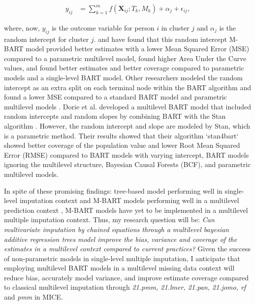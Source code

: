 \documentclass[10pt, a4paper, titlepage]{article}
\begin{document}
\begin{subequations}
\label{eq:M-BART}
\begin{align}
y_{ij} &= \sum_{k=1}^{m} f(\textbf{X}_{ij}; T_{k}, M_{k}) + \alpha_{j} + \epsilon_{ij}, \tag{3}
\end{align}
\end{subequations}

where, now, $y_{ij}$ is the outcome variable for person $i$ in cluster $j$ and $\alpha_{j}$ is the random intercept for cluster $j$. \citet{wagner2020} and have found that this random intercept M-BART model provided better estimates with a lower Mean Squared Error (MSE) compared to a parametric multilevel model, \citet{tan2016} found higher Area Under the Curve values, and \citet{chen2020} found better estimates and better coverage compared to parametric models and a single-level BART model. Other researchers modeled the random intercept as an extra split on each terminal node within the BART algorithm and found a lower MSE compared to a standard BART model and parametric multilevel models \citep{wundervald2022}. Dorie et al. developed a multilevel BART model that included random intercepts and random slopes by combining BART with the Stan algorithm \citep{dorie2022}. However, the random intercept and slope are modeled by Stan, which is a parametric method. Their results showed that their algorithm `stan4bart` showed better coverage of the population value and lower Root Mean Squared Error (RMSE) compared to BART models with varying intercept, BART models ignoring the multilevel structure, Bayesian Causal Forests (BCF), and parametric multilevel models.

In spite of these promising findings: tree-based model performing well in single-level imputation context \citep{burgette2010, xu2016, silva2022, stekhoven2012, waljee2013} and M-BART models performing well in a multilevel prediction context \citep{chen2020, wagner2020, tan2016, wundervald2022, dorie2022}, M-BART models have yet to be implemented in a multilevel multiple imputation context. Thus, my research question will be: \textit{Can multivariate imputation by chained equations through a multilevel bayesian additive regression trees model improve the bias, variance and coverage of the estimates in a multilevel context compared to current practices?} Given the success of non-parametric models in single-level multiple imputation, I anticipate that employing multilevel BART models in a multilevel missing data context will reduce bias, accurately model variance, and improve estimate coverage compared to classical multilevel imputation through \textit{21.pmm, 21.lmer, 21.pan, 21.jomo, rf} and \textit{pmm} in MICE.
\end{document}
